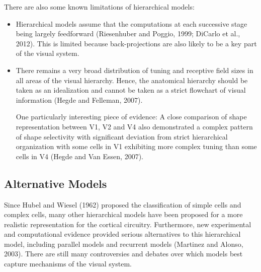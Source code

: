 \par There are also some known limitations of hierarchical models:
\begin{itemize}
    \item Hierarchical models assume that the computations at each successive stage being largely feedforward (Riesenhuber and Poggio, 1999; DiCarlo et al., 2012). This is limited because back-projections are also likely to be a key part of the visual system. 
    \item There remains a very broad distribution of tuning and receptive field sizes in all areas of the visual hierarchy. Hence, the anatomical hierarchy should be taken as an idealization and cannot be taken as a strict flowchart of visual information (Hegde and Felleman, 2007). 
    \par One particularly interesting piece of evidence: A close comparison of shape representation between V1, V2 and V4 also demonstrated a complex pattern of shape selectivity with significant deviation from strict hierarchical organization with some cells in V1 exhibiting more complex tuning than some cells in V4 (Hegde and Van Essen, 2007).
\end{itemize}


\subsection{Alternative Models}
\par Since Hubel and Wiesel (1962) proposed the classification of simple cells and complex cells, many other hierarchical models have been proposed for a more realistic representation for the cortical circuitry. Furthermore, new experimental and computational evidence provided serious alternatives to this hierarchical model, including parallel models and recurrent models (Martinez and Alonso, 2003). There are still many controversies and debates over which models best capture mechanisms of the visual system.

